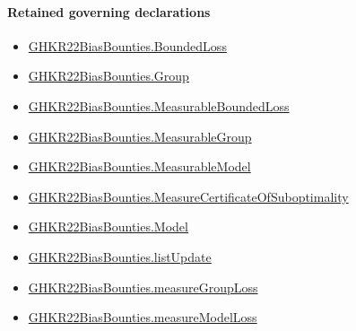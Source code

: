 \documentclass[10pt]{article}
\begin{document}
\paragraph{Retained governing declarations}
\begin{itemize}\raggedright
\item \hyperlink{paper-prerequisite-ef6c319b0770dad4}{GHKR22\allowbreak{}Bias\allowbreak{}Bounties.\allowbreak{}Bounded\allowbreak{}Loss}
\item \hyperlink{paper-prerequisite-cc7214115b27106f}{GHKR22\allowbreak{}Bias\allowbreak{}Bounties.\allowbreak{}Group}
\item \hyperlink{governing-declaration-56b96e1cde76e3f7}{GHKR22\allowbreak{}Bias\allowbreak{}Bounties.\allowbreak{}Measurable\allowbreak{}Bounded\allowbreak{}Loss}
\item \hyperlink{governing-declaration-8d5012d60e076f7c}{GHKR22\allowbreak{}Bias\allowbreak{}Bounties.\allowbreak{}Measurable\allowbreak{}Group}
\item \hyperlink{governing-declaration-8b721c00962c326a}{GHKR22\allowbreak{}Bias\allowbreak{}Bounties.\allowbreak{}Measurable\allowbreak{}Model}
\item \hyperlink{paper-prerequisite-ad05480b2c897936}{GHKR22\allowbreak{}Bias\allowbreak{}Bounties.\allowbreak{}Measure\allowbreak{}Certificate\allowbreak{}Of\allowbreak{}Suboptimality}
\item \hyperlink{paper-prerequisite-333127605c12eba8}{GHKR22\allowbreak{}Bias\allowbreak{}Bounties.\allowbreak{}Model}
\item \hyperlink{paper-prerequisite-6c3f0056117b6991}{GHKR22\allowbreak{}Bias\allowbreak{}Bounties.\allowbreak{}list\allowbreak{}Update}
\item \hyperlink{paper-prerequisite-c9cff6ba9100bf1c}{GHKR22\allowbreak{}Bias\allowbreak{}Bounties.\allowbreak{}measure\allowbreak{}Group\allowbreak{}Loss}
\item \hyperlink{paper-prerequisite-dff6b99e26543d78}{GHKR22\allowbreak{}Bias\allowbreak{}Bounties.\allowbreak{}measure\allowbreak{}Model\allowbreak{}Loss}
\end{itemize}
\end{document}
